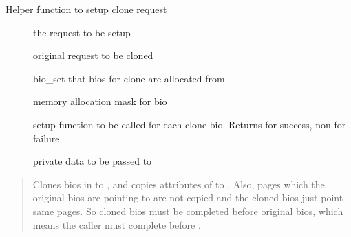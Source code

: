 \documentclass[a4paper,11pt,english]{sphinxmanual}
\begin{document}
\begin{fulllineitems}
\label{\detokenize{blk-mq:c.blk_rq_prep_clone}}
Helper function to setup clone request

\end{fulllineitems}


\begin{description}
\item[{}] \leavevmode
the request to be setup

\item[{}] \leavevmode
original request to be cloned

\item[{}] \leavevmode
bio\_set that bios for clone are allocated from

\item[{}] \leavevmode
memory allocation mask for bio

\item[{}] \leavevmode
setup function to be called for each clone bio.
Returns  for success, non  for failure.

\item[{}] \leavevmode
private data to be passed to 

\end{description}

\begin{quote}

Clones bios in  to , and copies attributes of  to .
Also, pages which the original bios are pointing to are not copied
and the cloned bios just point same pages.
So cloned bios must be completed before original bios, which means
the caller must complete  before .
\end{quote}
\end{document}
